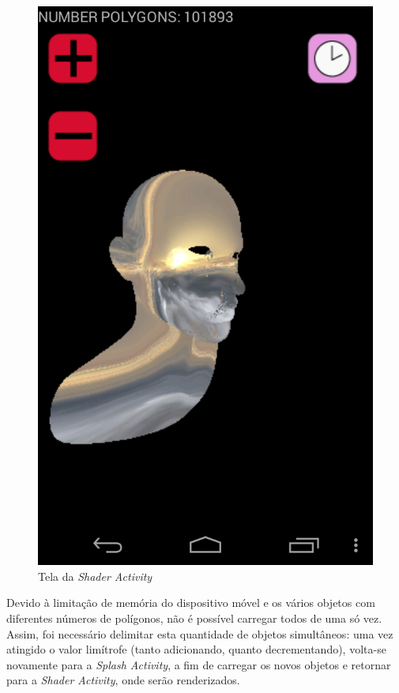 	\begin{figure}[ht]
	\centering
		\includegraphics[keepaspectratio=true,scale=0.2]{figuras/shader_act.png}
	\caption{Tela da \textit{Shader Activity}}
	\label{shader_act}
	\end{figure}

	Devido à limitação de memória do dispositivo móvel e os vários objetos com diferentes números de polígonos, não é possível carregar todos de uma só vez. Assim, foi necessário delimitar esta quantidade de objetos simultâneos: uma vez atingido o valor limítrofe (tanto adicionando, quanto decrementando), volta-se novamente para a \textit{Splash Activity}, a fim de carregar os novos objetos e retornar para a \textit{Shader Activity}, onde serão renderizados.

